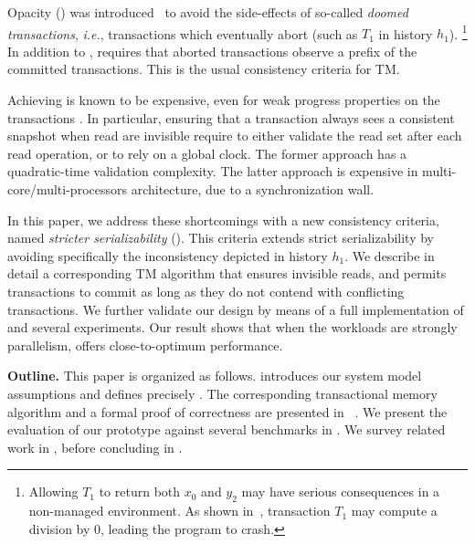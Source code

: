 Opacity (\OPA) was introduced~\cite{guerraoui2008correctness} to avoid the side-effects of so-called \emph{doomed transactions}, \emph{i.e.}, transactions which eventually abort (such as $T_1$ in history $h_1$).%
\footnote{
  Allowing $T_1$ to return both $x_0$ and $y_2$ may have serious consequences in a non-managed environment.
  As shown in~\cite{guerraoui2008correctness}, transaction $T_1$ may compute a division by $0$, leading the program to crash.
}
In addition to \SSER, \OPA requires that aborted transactions observe a prefix of the committed transactions.
This is the usual consistency criteria for TM.

Achieving \OPA is known to be expensive, even for weak progress properties on the transactions \cite{Ravi17}.
In particular, ensuring that a transaction always sees a consistent snapshot when read are invisible require to either validate the read set after each read operation, or to rely on a global clock.
The former approach has a quadratic-time validation complexity.
The latter approach is expensive in multi-core/multi-processors architecture, due to a synchronization wall.

In this paper, we address these shortcomings with a new consistency criteria, named \emph{stricter serializability} (\SPSER).
This criteria extends strict serializability by avoiding specifically the inconsistency depicted in history $h_1$.
We describe in detail a corresponding TM algorithm that ensures invisible reads, and permits transactions to commit as long as they do not contend with conflicting transactions.
We further validate our design by means of a full implementation of \SPSER and several experiments.
Our result shows that when the workloads are strongly parallelism, \SPSER offers close-to-optimum performance.

\textbf{Outline.}
This paper is organized as follows.
 introduces our system model assumptions and defines precisely \SPSER.
The corresponding transactional memory algorithm and a formal proof of correctness are presented in ~.
We present the evaluation of our prototype against several benchmarks in .
We survey related work in , before concluding in .
